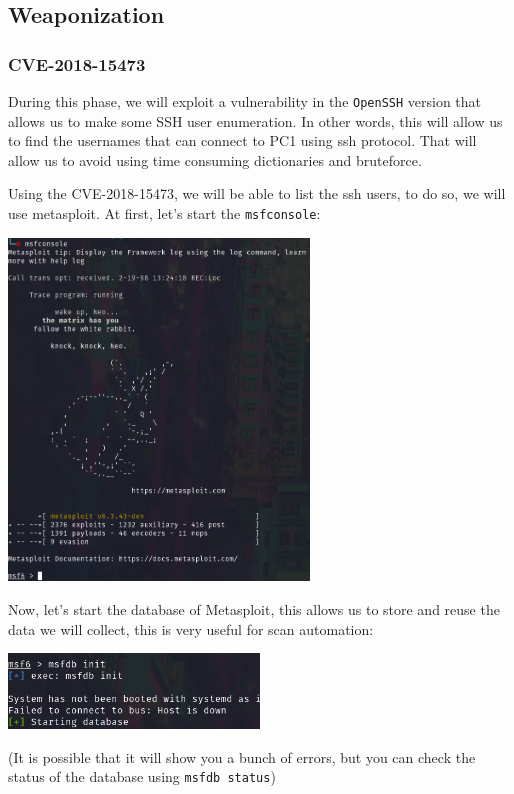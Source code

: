 \documentclass[a4paper,11pt,singlespacing]{article}
\begin{document}
\subsection{Weaponization}\label{weaponization}

\subsubsection{CVE-2018-15473}\label{cve-2018-15473}

During this phase, we will exploit a vulnerability in the
\texttt{OpenSSH} version that allows us to make some SSH user
enumeration. In other words, this will allow us to find the usernames
that can connect to PC1 using ssh protocol. That will allow us to avoid
using time consuming dictionaries and bruteforce.

Using the CVE-2018-15473, we will be able to list the ssh users, to do
so, we will use metasploit. At first, let's start the
\texttt{msfconsole}:

\includegraphics[width=0.6\textwidth,height=0.6\textheight]{./Images/Image09.png}

Now, let's start the database of Metasploit, this allows us to store and
reuse the data we will collect, this is very useful for scan automation:

\includegraphics[width=0.5\textwidth,height=0.5\textheight]{./Images/Image10.png}

(It is possible that it will show you a bunch of errors, but you can
check the status of the database using \texttt{msfdb\ status})
\end{document}
